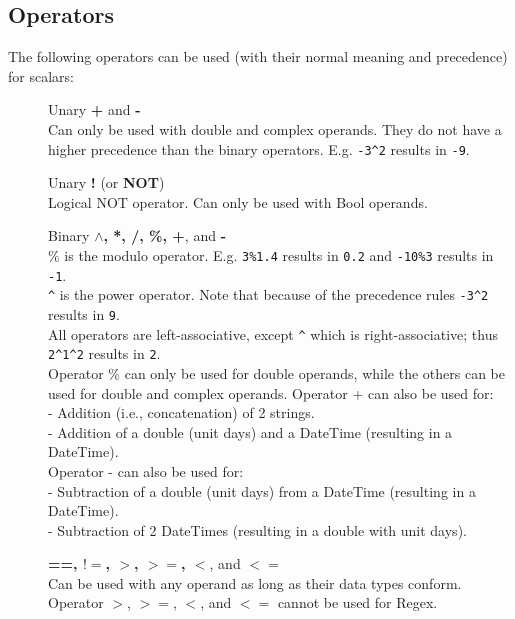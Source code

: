 \subsection{\label{TAQL:OPERATORS}Operators}
The following operators can be used (with their normal meaning and
precedence) for scalars:
\begin{description}
  \item[] Unary \textbf{+} and \textbf{-}
       \\Can only be used with double and complex operands.
       They do not have a higher precedence than the binary operators.
       E.g. \texttt{-3}\verb+^+\texttt{2} results in \texttt{-9}.
  \item[] Unary \textbf{!} (or \textbf{NOT})
       \\Logical NOT operator.
       Can only be used with Bool operands.
  \item[] Binary \textbf{$\wedge$, *, /, \%, +}, and \textbf{-}
       \\\% is the modulo operator.
       E.g. \texttt{3\%1.4} results in \texttt{0.2} and
       \texttt{-10\%3} results in \texttt{-1}.
       \\\verb+^+ is the power operator.
       Note that because of the precedence rules
       \texttt{-3}\verb+^+\texttt{2} results in \texttt{9}.
       \\All operators are left-associative, except \verb+^+ which is
       right-associative; thus \texttt{2}\verb+^+\texttt{1}\verb+^+\texttt{2} results in \texttt{2}.
       \\Operator \% can only be used for double operands, while the others
       can be used for double and complex operands.
       Operator + can also be used for:
       \\- Addition (i.e., concatenation) of 2 strings.
       \\- Addition of a double (unit days) and a DateTime
       (resulting in a DateTime).
       \\Operator - can also be used for:
       \\- Subtraction of a double (unit days) from a DateTime
       (resulting in a DateTime).
       \\- Subtraction of 2 DateTimes (resulting in a double with unit days).
  \item[] \textbf{==, $!=$, $>$, $>=$, $<$}, and \textbf{$<=$}
       \\Can be used with any operand as long as their data types conform.
       Operator $>$, $>=$, $<$, and $<=$ cannot be used for Regex.

\end{description}
